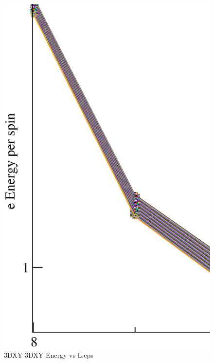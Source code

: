 \begin{figure}[!htpb]
  \centering
  \includegraphics[width=\textwidth]{./plots/3DXY/3DXY_Energy_vs_L.eps}
  \caption{3DXY 3DXY Energy vs L.eps}
\end{figure}

